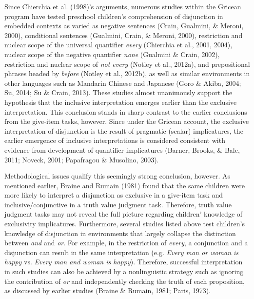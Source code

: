 \documentclass[,man,floatsintext]{apa6}
\begin{document}
Since Chierchia et al. (1998)'s arguments, numerous studies within the Gricean program have tested preschool children's comprehension of disjunction in embedded contexts as varied as negative sentences (Crain, Gualmini, \& Meroni, 2000), conditional sentences (Gualmini, Crain, \& Meroni, 2000), restriction and nuclear scope of the universal quantifier \emph{every} (Chierchia et al., 2001, 2004), nuclear scope of the negative quantifier \emph{none} (Gualmini \& Crain, 2002), restriction and nuclear scope of \emph{not every} (Notley et al., 2012a), and prepositional phrases headed by \emph{before} (Notley et al., 2012b), as well as similar environments in other languages such as Mandarin Chinese and Japanese (Goro \& Akiba, 2004; Su, 2014; Su \& Crain, 2013). These studies almost unanimously support the hypothesis that the inclusive interpretation emerges earlier than the exclusive interpretation. This conclusion stands in sharp contrast to the earlier conclusions from the give-item tasks, however. Since under the Gricean account, the exclusive interpretation of disjunction is the result of pragmatic (scalar) implicatures, the earlier emergence of inclusive interpretations is considered consistent with evidence from development of quantifier implicatures (Barner, Brooks, \& Bale, 2011; Noveck, 2001; Papafragou \& Musolino, 2003).

Methodological issues qualify this seemingly strong conclusion, however. As mentioned earlier, Braine and Rumain (1981) found that the same children were more likely to interpret a disjunction as exclusive in a give-item task and inclusive/conjunctive in a truth value judgment task. Therefore, truth value judgment tasks may not reveal the full picture regarding children' knowledge of exclusivity implicatures. Furthermore, several studies listed above test children's knowledge of disjunction in environments that largely collapse the distinction between \emph{and} and \emph{or}. For example, in the restriction of \emph{every}, a conjunction and a disjunction can result in the same interpretation (e.g. \emph{Every man or woman is happy} vs. \emph{Every man and woman is happy}). Therefore, successful interpretation in such studies can also be achieved by a nonlinguistic strategy such as ignoring the contribution of \emph{or} and independently checking the truth of each proposition, as discussed by earlier studies (Braine \& Rumain, 1981; Paris, 1973).
\end{document}
